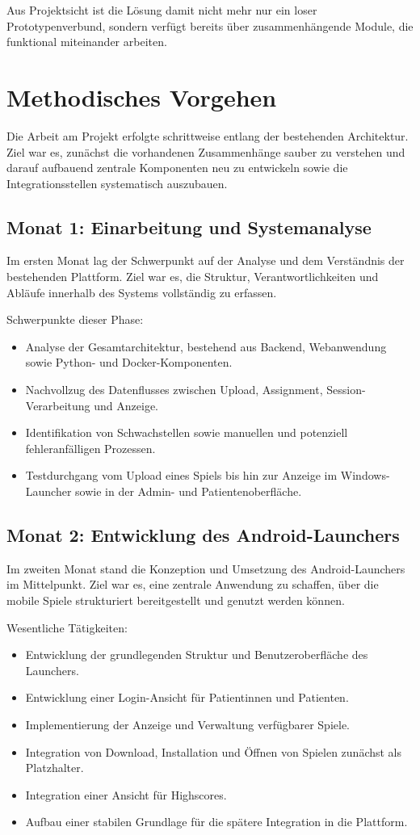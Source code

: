 \documentclass[a4paper,10pt,ngerman]{INSOproject}
\begin{document}
Aus Projektsicht ist die Lösung damit nicht mehr nur ein loser Prototypenverbund, sondern verfügt bereits über zusammenhängende Module, die funktional miteinander arbeiten.

\section{Methodisches Vorgehen}
Die Arbeit am Projekt erfolgte schrittweise entlang der bestehenden Architektur. Ziel war es, zunächst die vorhandenen Zusammenhänge sauber zu verstehen und darauf aufbauend zentrale Komponenten neu zu entwickeln sowie die Integrationsstellen systematisch auszubauen.

\subsection{Monat 1: Einarbeitung und Systemanalyse}
Im ersten Monat lag der Schwerpunkt auf der Analyse und dem Verständnis der bestehenden Plattform. Ziel war es, die Struktur, Verantwortlichkeiten und Abläufe innerhalb des Systems vollständig zu erfassen.

Schwerpunkte dieser Phase:
\begin{itemize}
  \item Analyse der Gesamtarchitektur, bestehend aus Backend, Webanwendung sowie Python- und Docker-Komponenten.
  \item Nachvollzug des Datenflusses zwischen Upload, Assignment, Session-Verarbeitung und Anzeige.
  \item Identifikation von Schwachstellen sowie manuellen und potenziell fehleranfälligen Prozessen.
  \item Testdurchgang vom Upload eines Spiels bis hin zur Anzeige im Windows-Launcher sowie in der Admin- und Patientenoberfläche.
\end{itemize}

\subsection{Monat 2: Entwicklung des Android-Launchers}
Im zweiten Monat stand die Konzeption und Umsetzung des Android-Launchers im Mittelpunkt. Ziel war es, eine zentrale Anwendung zu schaffen, über die mobile Spiele strukturiert bereitgestellt und genutzt werden können.

Wesentliche Tätigkeiten:
\begin{itemize}
  \item Entwicklung der grundlegenden Struktur und Benutzeroberfläche des Launchers.
  \item Entwicklung einer Login-Ansicht für Patientinnen und Patienten.
  \item Implementierung der Anzeige und Verwaltung verfügbarer Spiele.
  \item Integration von Download, Installation und Öffnen von Spielen zunächst als Platzhalter.
  \item Integration einer Ansicht für Highscores.
  \item Aufbau einer stabilen Grundlage für die spätere Integration in die Plattform.
\end{itemize}
\end{document}

